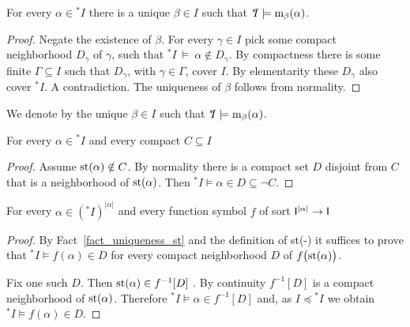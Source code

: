 \documentclass[10pt,oneside]{amsproc}
\renewcommand*{\emph}[1]{%
   \smash{\tikz[baseline]\node[rectangle, fill=teal!25, rounded corners, inner xsep=0.5ex, inner ysep=0.2ex, anchor=base, minimum height = 2.7ex]{\strut #1};}}
\begin{document}
\begin{fact}\label{fact_uniqueness_st}
  For every $\alpha\in{}^*\!\!I$ there is a unique $\beta\in I$ such that ${}^*\!\!I\models{\rm m}_\beta(\alpha)$.
\end{fact}

\begin{proof}
  Negate the existence of $\beta$.
  For every $\gamma\in I$ pick some compact neighborhood $D_\gamma$ of $\gamma$, such that ${}^*\!\!I\ \models\ \alpha\notin D_\gamma$.
  By compactness there is some finite $\Gamma\subseteq I$ such that $D_\gamma$, with $\gamma\in\Gamma$, cover $I$.
  By elementarity these $D_{\gamma}$ also cover ${}^*\!\!I$.
  A contradiction.
  The uniqueness of $\beta$ follows from normality.
\end{proof}

We denote by \emph{${\rm st}(\alpha)$\/} the unique $\beta\in I$ such that ${}^*\!\!I\models{\rm m}_\beta(\alpha)$.

\begin{fact}\label{fact_st1}
  For every $\alpha\in{}^*\! I$ and every compact $C\subseteq I$

\end{fact}

\begin{proof}
  Assume ${\rm st}(\alpha)\notin C$.
  By normality there is a compact set $D$ disjoint from $C$ that is a neighborhood of ${\rm st}(\alpha)$.
  Then  ${}^*\!\!I\models\alpha\in D\subseteq\neg C$.
\end{proof}

\begin{fact}\label{fact_terms_st}
  For every $\alpha\in({}^*\!\!I)^{|\alpha|}$ and every function symbol $f$ of sort ${\sf I}^{|\alpha|}\to{\sf I}$

\end{fact}

\begin{proof}
  By Fact~\ref{fact_uniqueness_st} and the definition of st(-) it suffices to prove that ${}^*\!\!I\models f(\alpha)\in D$ for every compact neighborhood $D$ of $f\big({\rm st}(\alpha)\big)$.
  
  Fix one such $D$.
  Then ${\rm st}(\alpha)\in f^{-1}[D]$ .
  By continuity $f^{-1}[D]$ is a compact neighborhood of ${\rm st}(\alpha)$.
  Therefore ${}^*\!\!I\models \alpha\in f^{-1}[D]$ and, as $I\preceq{}^*\!\!I$ we obtain ${}^*\!\!I\models f(\alpha)\in D$.
\end{proof}
\end{document}
